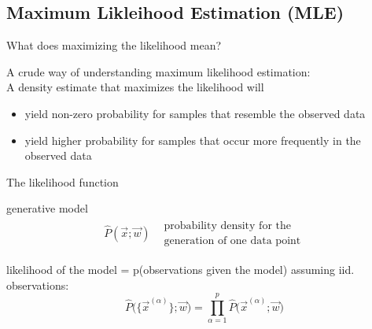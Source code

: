 \subsection{Maximum Likleihood Estimation (MLE)}


\begin{frame}{What does maximizing the likelihood mean?}

A crude way of understanding maximum likelihood estimation:\\

A density estimate that maximizes the likelihood will

\begin{itemize}
\item yield non-zero probability for samples that resemble the observed data
\item yield higher probability for samples that occur more frequently in the observed data
\end{itemize}

\end{frame}

\begin{frame}{The likelihood function}

 \begin{block}{generative model}
    \begin{equation}
        \begin{array}{lr}
        \widehat{P}(\vec{x};\vec{w}) 
        & \substack{ \text{probability density for the} \\
                   \text{generation of one data point} }
        \end{array}
\end{equation}
  \end{block}
\vspace{4mm}

\begin{block}{likelihood of the model = p(observations given the model)}
 assuming iid. observations:
\begin{equation}
                \widehat{P}\big( \big\{ \vec{x}^{(\alpha)} \big\};\vec{w} \big)
                = \prod\limits_{\alpha = 1}^p \widehat{P}\big(\vec{x}^{(\alpha)}
                        ;\vec{w} \big)
\end{equation}
\end{block}

\end{frame}

